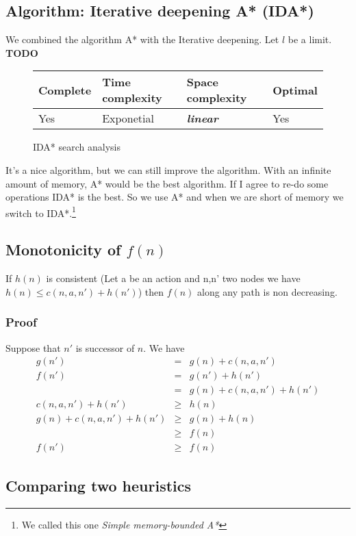 \subsection{Algorithm: Iterative deepening A* (IDA*)}

We combined the algorithm A* with the Iterative deepening. Let $l$ be a limit. \textbf{TODO}

\begin{figure}[H]
\centering
\begin{tabular}{|llll|}
\hline
\textbf{Complete} & \textbf{Time complexity} & \textbf{Space complexity} & \textbf{Optimal} \\
\hline
Yes & Exponetial & \textbf{\textit{linear}} & Yes\\
\hline
\end{tabular}
\caption{IDA* search analysis}
\end{figure}

It's a nice algorithm, but we can still improve the algorithm. With an infinite amount of memory, A* would be the best algorithm. If I agree to re-do some operations IDA* is the best. So we use A* and when we are short of memory we switch to IDA*.\footnote{We called this one \textit{Simple memory-bounded A*}}

\subsection{Monotonicity of $f(n)$}

If $h(n)$ is consistent (Let a be an action and n,n' two nodes we have $h(n) \leq c(n,a,n') + h(n')$) then $f(n)$ along any path is non decreasing.

\subsubsection{Proof}

Suppose that $n'$ is successor of $n$. We have
\begin{eqnarray*}
g(n') &=& g(n) + c(n,a,n')\\
f(n') &=& g(n') + h(n')\\
&=& g(n) + c(n,a,n') + h(n')\\
c(n,a,n') +h(n') &\geq& h(n)\\
g(n) + c(n,a,n') + h(n') &\geq& g(n) + h(n)\\
&\geq& f(n) \\
f(n') &\geq& f(n)
\end{eqnarray*}

\subsection{Comparing two heuristics}

